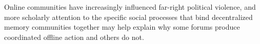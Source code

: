 \documentclass[bibtex,autowc,nonblind]{apsr_submission}
\begin{document}
Online communities have increasingly influenced far-right political violence, and more scholarly attention to the specific social processes that bind decentralized memory communities together may help explain why some forums produce coordinated offline action and others do not.



\end{document}
